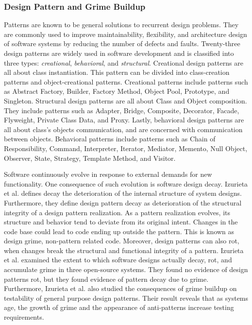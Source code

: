 \subsubsection{Design Pattern and Grime Buildup}
Patterns are known to be general solutions to recurrent design problems. They are commonly used to improve maintainability, flexibility, and architecture design of software systems by reducing the number of defects and faults. Twenty-three design patterns are widely used in software development and is classified into three types\cite{Desig53:online}: \textit{creational}, \textit{behavioral}, and \textit{structural}. Creational design patterns are all about class instantiation. This pattern can be divided into class-creation patterns and object-creational patterns. Creational patterns include patterns such as Abstract Factory, Builder, Factory Method, Object Pool, Prototype, and Singleton\cite{Desig53:online}. Structural design patterns are all about Class and Object composition. They include patterns such as Adapter, Bridge, Composite, Decorator, Facade, Flyweight, Private Class Data, and Proxy\cite{Desig53:online}. Lastly, behavioral design patterns are all about class's objects communication, and are concerned with communication between objects. Behavioral patterns include patterns such as Chain of Responsibility, Command, Interpreter, Iterator, Mediator, Memento, Null Object, Observer, State, Strategy, Template Method, and Visitor\cite{Desig53:online}. 

Software continuously evolve in response to external demands for new functionality. One consequence of such evolution is software design decay. Izurieta et al.\cite{izurieta2007software} defines decay the deterioration of the internal structure of system designs. Furthermore, they define design pattern decay as deterioration of the structural integrity of a design pattern realization. As a pattern realization evolves, its structure and behavior tend to deviate from its original intent. Changes in the code base could lead to code ending up outside the pattern. This is known as design grime, non-pattern related code\cite{izurieta2007software}. Moreover, design patterns can also rot, when changes break the structural and functional integrity of a pattern\cite{izurieta2007software}. Izurieta et al.\cite{izurieta2013multiple} examined the extent to which software designs actually decay, rot, and accumulate grime in three open-source systems. They found no evidence of design patterns rot, but they found evidence of pattern decay due to grime. Furthermore, Izurieta et al.\cite{izurieta2008testing} also studied the consequences of grime buildup on testability of general purpose design patterns. Their result reveals that as systems age, the growth of grime and the appearance of anti-patterns increase testing requirements.



